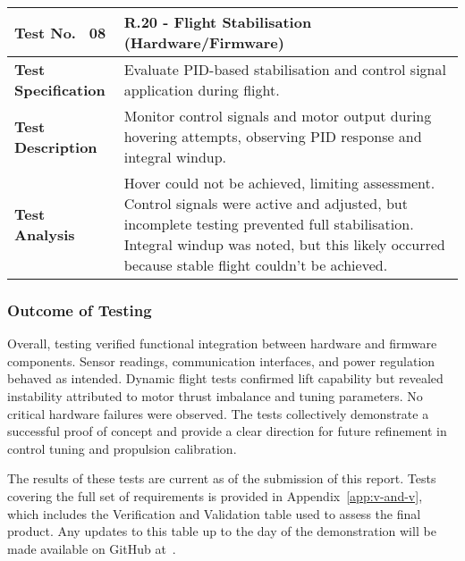 \begin{table}[H]
\centering
\renewcommand{\arraystretch}{1.2}
\begin{tabular}{|p{3.5cm}|p{12cm}|}
\hline
\textbf{Test No. \, 08} & \textbf{R.20 - Flight Stabilisation} (Hardware/Firmware) \\ \hline
\textbf{Test Specification} & 
Evaluate PID-based stabilisation and control signal application during flight. \\ \hline
\textbf{Test Description} & 
Monitor control signals and motor output during hovering attempts, observing PID response and integral windup. \\ \hline
\textbf{Test Analysis} & 
Hover could not be achieved, limiting assessment. Control signals were active and adjusted, but incomplete testing prevented full stabilisation. Integral windup was noted, but this likely occurred because stable flight couldn't be achieved. \\ \hline
\end{tabular}
\end{table}

\subsubsection{Outcome of Testing} \leavevmode

Overall, testing verified functional integration between hardware and firmware components. Sensor readings, communication interfaces, and power regulation behaved as intended. Dynamic flight tests confirmed lift capability but revealed instability attributed to motor thrust imbalance and tuning parameters. No critical hardware failures were observed. The tests collectively demonstrate a successful proof of concept and provide a clear direction for future refinement in control tuning and propulsion calibration.

The results of these tests are current as of the submission of this report. Tests covering the full set of requirements is provided in Appendix~\ref{app:v-and-v}, which includes the Verification and Validation table used to assess the final product. Any updates to this table up to the day of the demonstration will be made available on GitHub at~\cite{flightcontroller_git}.